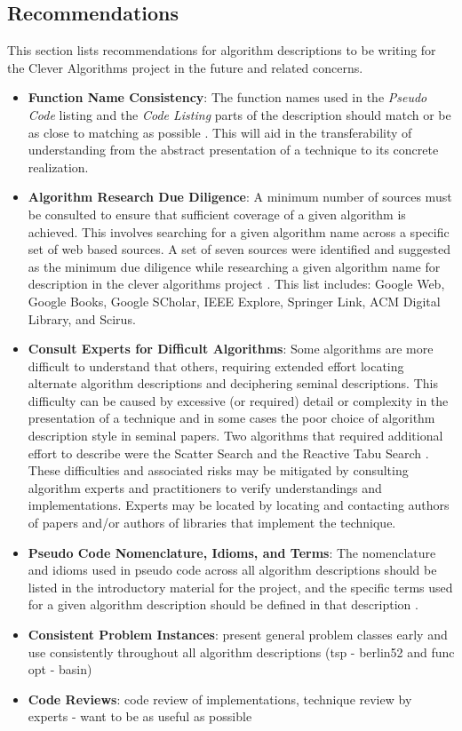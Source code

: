 \documentclass[a4paper, 11pt]{article}
\begin{document}
% 
% 
\subsection{Recommendations}
This section lists recommendations for algorithm descriptions to be writing for the Clever Algorithms project in the future and related concerns. 

\begin{itemize}
	\item \textbf{Function Name Consistency}: The function names used in the \emph{Pseudo Code} listing and the \emph{Code Listing} parts of the description should match or be as close to matching as possible \cite{Brownlee2010g}. This will aid in the transferability of understanding from the abstract presentation of a technique to its concrete realization.
	\item \textbf{Algorithm Research Due Diligence}: A minimum number of sources must be consulted to ensure that sufficient coverage of a given algorithm is achieved. This involves searching for a given algorithm name across a specific set of web based sources. A set of seven sources were identified and suggested as the minimum due diligence while researching a given algorithm name for description in the clever algorithms project \cite{Brownlee2010h}. This list includes: Google Web, Google Books, Google SCholar, IEEE Explore, Springer Link, ACM Digital Library, and Scirus.
	\item \textbf{Consult Experts for Difficult Algorithms}: Some algorithms are more difficult to understand that others, requiring extended effort locating alternate algorithm descriptions and deciphering seminal descriptions.  This difficulty can be caused by excessive (or required) detail or complexity in the presentation of a technique and in some cases the poor choice of algorithm description style in seminal papers. Two algorithms that required additional effort to describe were the Scatter Search \cite{Brownlee2010l} and the Reactive Tabu Search \cite{Brownlee2010m}. These difficulties and associated risks may be mitigated by consulting algorithm experts and practitioners to verify understandings and implementations. Experts may be located by locating and contacting authors of papers and/or authors of libraries that implement the technique. 
	\item \textbf{Pseudo Code Nomenclature, Idioms, and Terms}: The nomenclature and idioms used in pseudo code across all algorithm descriptions should be listed in the introductory material for the project, and the specific terms used for a given algorithm description should be defined in that description \cite{Brownlee2010m}.
		
		
	\item \textbf{Consistent Problem Instances}: present general problem classes early and use consistently throughout all algorithm descriptions (tsp - berlin52 and func opt - basin)
	\item \textbf{Code Reviews}: code review of implementations, technique review by experts - want to be as useful as possible
	
\end{itemize}
\end{document}
